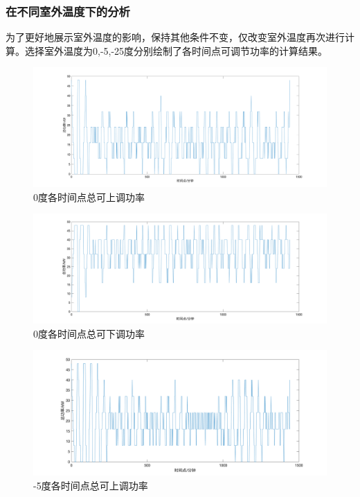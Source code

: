 \documentclass[withoutpreface,bwprint]{cumcmthesis} %
\begin{document}
    \subsubsection{在不同室外温度下的分析}
    为了更好地展示室外温度的影响，保持其他条件不变，仅改变室外温度再次进行计算。选择室外温度为0,-5,-25度分别绘制了各时间点可调节功率的计算结果。
    
       \begin{figure}[H]
    \centering
        \includegraphics[width=1\textwidth]{figures/3-3-0.png}
    \caption{0度各时间点总可上调功率}
    \label{fig:my_label}
    \end{figure}
    
    \begin{figure}[H]
    \centering
        \includegraphics[width=1\textwidth]{figures/3-3-0-down.png}
    \caption{0度各时间点总可下调功率}
    \label{fig:my_label}
    \end{figure}
           \begin{figure}[H]
    \centering
        \includegraphics[width=1\textwidth]{figures/3-3-5-up.png}
    \caption{-5度各时间点总可上调功率}
    \label{fig:my_label}
    \end{figure}
    
\end{document}
